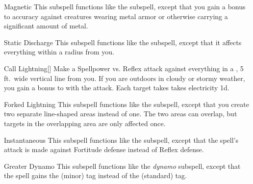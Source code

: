 \begin{ability}[\nth{2}]{Magnetic}
This subspell functions like the  subspell, except that you gain a  bonus to accuracy against creatures wearing metal armor or otherwise carrying a significant amount of metal.
\end{ability}
\vspace{0.25em}


\begin{ability}[\nth{2}]{Static Discharge}
This subspell functions like the  subspell, except that it affects everything within a \areamed radius from you.
\end{ability}
\vspace{0.25em}


\begin{ability}[\nth{3}]{Call Lightning}[]
Make a Spellpower vs. Reflex attack against everything in a \arealarge, 5 ft.\ wide vertical line from you.
If you are outdoors in cloudy or stormy weather, you gain a  bonus to  with the attack.
\hit Each target takes takes electricity  \plus1d.
\end{ability}
\vspace{0.25em}


\begin{ability}[\nth{3}]{Forked Lightning}
This subspell functions like the  subspell, except that you create two separate line-shaped areas instead of one.
The two areas can overlap, but targets in the overlapping area are only affected once.
\end{ability}
\vspace{0.25em}


\begin{ability}[\nth{4}]{Instantaneous}
This subspell functions like the  subspell, except that the spell's attack is made against Fortitude defense instead of Reflex defense.
\end{ability}
\vspace{0.25em}


\begin{ability}[\nth{5}]{Greater Dynamo}
This subspell functions like the \textit{dynamo} subspell, except that the spell gains the  (minor) tag instead of the  (standard) tag.
\end{ability}
\vspace{0.25em}


